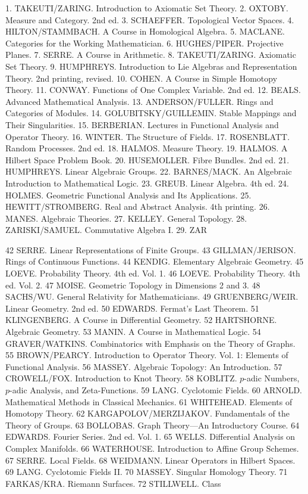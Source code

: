 1. TAKEUTI/ZARING. Introduction to Axiomatic Set Theory.
2. OXTOBY. Measure and Category. 2nd ed.
3. SCHAEFFER. Topological Vector Spaces.
4. HILTON/STAMMBACH. A Course in Homological Algebra.
5. MACLANE. Categories for the Working Mathematician.
6. HUGHES/PIPER. Projective Planes.
7. SERRE. A Course in Arithmetic.
8. TAKEUTI/ZARING. Axiomatic Set Theory.
9. HUMPHREYS. Introduction to Lie Algebras and Representation Theory. 2nd printing, revised.
10. COHEN. A Course in Simple Homotopy Theory.
11. CONWAY. Functions of One Complex Variable. 2nd ed.
12. BEALS. Advanced Mathematical Analysis.
13. ANDERSON/FULLER. Rings and Categories of Modules.
14. GOLUBITSKY/GUILLEMIN. Stable Mappings and Their Singularities.
15. BERBERIAN. Lectures in Functional Analysis and Operator Theory.
16. WINTER. The Structure of Fields.
17. ROSENBLATT. Random Processes. 2nd ed.
18. HALMOS. Measure Theory.
19. HALMOS. A Hilbert Space Problem Book.
20. HUSEMOLLER. Fibre Bundles. 2nd ed.
21. HUMPHREYS. Linear Algebraic Groups.
22. BARNES/MACK. An Algebraic Introduction to Mathematical Logic.
23. GREUB. Linear Algebra. 4th ed.
24. HOLMES. Geometric Functional Analysis and Its Applications.
25. HEWITT/STROMBERG. Real and Abstract Analysis. 4th printing.
26. MANES. Algebraic Theories.
27. KELLEY. General Topology.
28. ZARISKI/SAMUEL. Commutative Algebra I.
29. ZAR

42 SERRE. Linear Representations of Finite Groups.
43 GILLMAN/JERISON. Rings of Continuous Functions.
44 KENDIG. Elementary Algebraic Geometry.
45 LOEVE. Probability Theory. 4th ed. Vol. 1.
46 LOEVE. Probability Theory. 4th ed. Vol. 2.
47 MOISE. Geometric Topology in Dimensions 2 and 3.
48 SACHS/WU. General Relativity for Mathematicians.
49 GRUENBERG/WEIR. Linear Geometry. 2nd ed.
50 EDWARDS. Fermat’s Last Theorem.
51 KLINGENBERG. A Course in Differential Geometry.
52 HARTSHORNE. Algebraic Geometry.
53 MANIN. A Course in Mathematical Logic.
54 GRAVER/WATKINS. Combinatorics with Emphasis on the Theory of Graphs.
55 BROWN/PEARCY. Introduction to Operator Theory. Vol. 1: Elements of Functional Analysis.
56 MASSEY. Algebraic Topology: An Introduction.
57 CROWELL/FOX. Introduction to Knot Theory.
58 KOBLITZ. $p$-adic Numbers, $p$-adic Analysis, and Zeta-Functions.
59 LANG. Cyclotomic Fields.
60 ARNOLD. Mathematical Methods in Classical Mechanics.
61 WHITEHEAD. Elements of Homotopy Theory.
62 KARGAPOLOV/MERZIJAKOV. Fundamentals of the Theory of Groups.
63 BOLLOBAS. Graph Theory—An Introductory Course.
64 EDWARDS. Fourier Series. 2nd ed. Vol. 1.
65 WELLS. Differential Analysis on Complex Manifolds.
66 WATERHOUSE. Introduction to Affine Group Schemes.
67 SERRE. Local Fields.
68 WEIDMANN. Linear Operators in Hilbert Spaces.
69 LANG. Cyclotomic Fields II.
70 MASSEY. Singular Homology Theory.
71 FARKAS/KRA. Riemann Surfaces.
72 STILLWELL. Class
